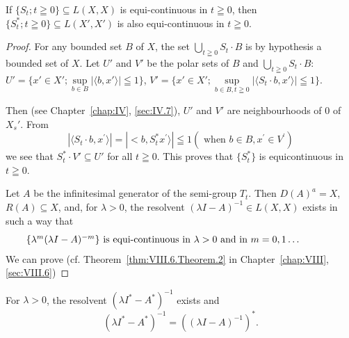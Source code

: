 \begin{proposition}\label{prop:IX.13.Proposition.1} If $\{S_t; t \geqq 0\} \subseteq L(X, X)$ is equi-continuous in $t \geqq 0$, then $\{S_t^*; t \geqq 0\} \subseteq L(X', X')$ is also equi-continuous in $t \geqq 0$. 
\end{proposition}

\begin{proof}
 For any bounded set $B$ of $X$, the set $\bigcup\limits_{t\geqq 0}S_t\cdot B$ is by hypothesis a bounded set of $X$. Let $U'$ and $V'$ be the polar sets of $B$ and $\bigcup\limits_{t\geqq 0}S_t\cdot B$: $U' = \{x' \in X'; \sup\limits_{b\in B}|\langle b,x'\rangle |\leqq 1\}$, $V' = \{x' \in X'; \sup\limits_{b\in B,t\geqq 0}|\langle S_t\cdot b,x'\rangle |\leqq 1\}$. 

Then (see Chapter~\ref{chap:IV}, \ref{sec:IV.7}), $U'$ and $V'$ are neighbourhoods of $0$ of $X_s'$. From 
\[
\left| \langle S _{t} \cdot b, x ^{\prime} \rangle \right| = | < b, S _{t} ^{*} x ^{\prime} \rangle | \leqq 1 (\text{ when } b \in B, x ^{\prime} \in V ^{\prime})
\]
we see that $S_{t}^{*} \cdot V' \subseteq U'$ for all $t \geqq 0$. This proves that $\{S_{t}^{*}\}$ is equicontinuous in $t \geqq 0$. 

Let $A$ be the infinitesimal generator of the semi-group $T_{t}$. Then $D(A)^{a} = X$, $R(A) \subseteq X$, and, for $\lambda > 0$, the resolvent $(\lambda I - A)^{-1} \in L(X, X)$ exists in such a way that 
\begin{equation}
\label{eq:IX.13.1}
\begin{minipage}{0.92\linewidth}
\everymath{}\let\limits\nolimits
$\{\lambda^m (\lambda I - A)^{-m}\}$ is equi-continuous in $\lambda >0$ and in $m = 0,1\ldots$
\end{minipage}
\end{equation}
We can prove (cf. Theorem~\ref{thm:VIII.6.Theorem.2} in Chapter~\ref{chap:VIII}, \ref{sec:VIII.6}) 
\end{proof}


\begin{proposition}\label{prop:IX.13.Proposition.2} For $\lambda > 0$, the resolvent $(\lambda I^{*} - A^{*})^{-1}$ exists and 
\begin{equation}\label{eq:IX.13.2}
(\lambda I ^{*} - A ^{*}) ^{-1} = ((\lambda I - A) ^{-1}) ^{*}.
\end{equation}
\end{proposition}

